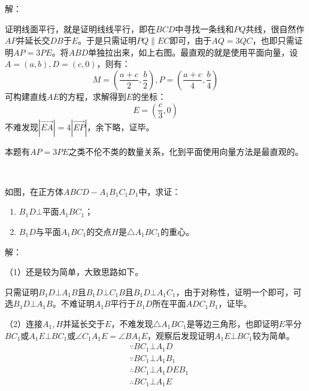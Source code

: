 解：

证明线面平行，就是证明线线平行，即在$BCD$中寻找一条线和$PQ$共线，很自然作$AP$并延长交$DB$于$E$。于是只需证明$PQ\parallel EC$即可，由于$AQ=3QC$，也即只需证明$AP=3PE$。将$ABD$单独拉出来，如上右图。最直观的就是使用平面向量，设$A=\left( a,b \right) ,D=\left( c,0 \right) $，则有：
\[
M=\left( \frac{a+c}{2},\frac{b}{2} \right) ,P=\left( \frac{a+c}{4},\frac{b}{4} \right)
\]
可构建直线$AE$的方程，求解得到$E$的坐标：
\[
E=\left( \frac{c}{3},0 \right)
\]
不难发现$\left| \overrightarrow{EA} \right|=4\left| \overrightarrow{EP} \right| $，余下略，证毕。

\begin{tcolorbox}
本题有$AP=3PE$之类不伦不类的数量关系，化到平面使用向量方法是最直观的。
\end{tcolorbox}

~

\begin{example}
如图，在正方体$ABCD-A_1B_1C_1D_1$中，求证：
\begin{enumerate}
    \item $B_1D\bot \text{平面}A_1BC_1$；
    \item $B_1D$与平面$A_1BC_1$的交点$H$是$\bigtriangleup A_1BC_1$的重心。
\end{enumerate}
\end{example}

\begin{figure}[h]
\centering
{}
\end{figure}

解：

（1）还是较为简单，大致思路如下。

只需证明$B_1D\bot A_1B$且$B_1D\bot C_1B$且$B_1D\bot A_1C_1$，由于对称性，证明一个即可，可选$B_1D\bot A_1B$。不难证明$A_1B$平行于$B_1D$所在平面$ADC_1B_1$，证毕。

（2）连接$A_1,H$并延长交于$E$，不难发现$\bigtriangleup A_1BC_1$是等边三角形，也即证明$E$平分$BC_1$或$A_1E\bot BC_1$或$\angle C_1A_1E=\angle BA_1E$，观察后发现证明$A_1E\bot BC_1$较为简单。
\begin{align*}
&\because BC_1\bot A_1D \\
&\because BC_1\bot A_1B_1 \\
&\therefore BC_1\bot A_1DEB_1 \\
&\therefore BC_1\bot A_1E
\end{align*}

